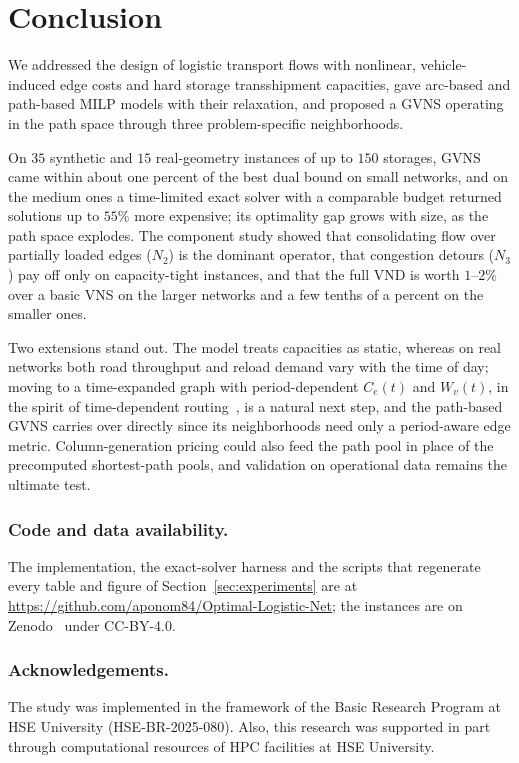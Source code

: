 \documentclass[runningheads]{llncs}
\begin{document}
\section{Conclusion}
\label{sec:concl}
We addressed the design of logistic transport flows with nonlinear,
vehicle-induced edge costs and hard storage transshipment capacities, gave
arc-based and path-based MILP models with their relaxation, and proposed a GVNS
operating in the path space through three problem-specific neighborhoods.


On $35$ synthetic and $15$ real-geometry instances of up to $150$ storages, GVNS
came within about one percent of the best dual bound on small networks, and on the
medium ones a time-limited exact solver with a comparable budget returned solutions
up to $55\%$ more expensive; its optimality gap grows with size, as the path space
explodes.
The component study showed that consolidating flow over partially loaded edges
($N_2$) is the dominant operator, that congestion detours ($N_3$) pay off only on
capacity-tight instances, and that the full VND is worth $1$--$2\%$ over a basic
VNS on the larger networks and a few tenths of a percent on the smaller ones.

Two extensions stand out. The model treats capacities as static, whereas on real
networks both road throughput and reload demand vary with the time of day; moving
to a time-expanded graph with period-dependent $C_e(t)$ and $W_v(t)$, in the
spirit of time-dependent routing~\cite{gendreau2015tdr}, is a natural next step,
and the path-based GVNS carries over directly since its neighborhoods need only a
period-aware edge metric. Column-generation pricing could also feed the path pool
in place of the precomputed shortest-path pools, and validation on operational
data remains the ultimate test.

\subsubsection*{Code and data availability.}
The implementation, the exact-solver harness and the scripts that regenerate every
table and figure of Section~\ref{sec:experiments} are at
\url{https://github.com/aponom84/Optimal-Logistic-Net}; the instances are on
Zenodo~\cite{benchmark-data} under CC-BY-4.0.

\subsubsection*{Acknowledgements.}
The study was implemented in the framework of the Basic Research Program at
HSE University (HSE-BR-2025-080).
Also, this research was supported in part through computational resources of HPC facilities at HSE University.
\end{document}
